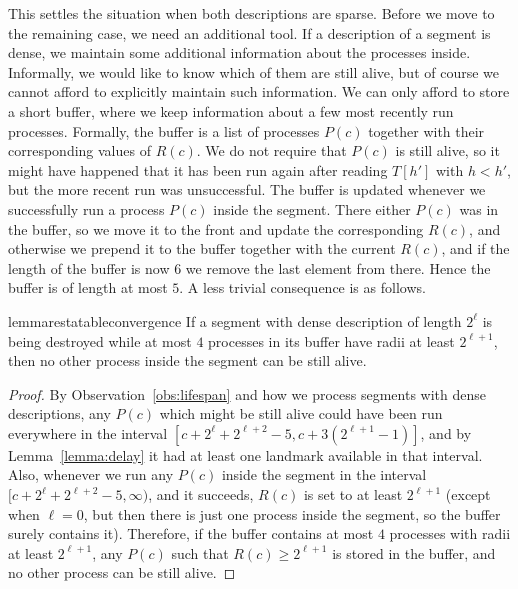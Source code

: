 \documentclass{article}[11pt,letter]
\newcommand{\head}{h}
\begin{document}
This settles the situation when both descriptions are sparse. Before we move to the remaining case, we need an additional tool. If a
description of a segment is dense, we maintain some additional information about the processes inside. Informally, we would like to know which
of them are still alive, but of course we cannot afford to explicitly maintain such information. We can only afford to store a short buffer, 
where we keep information about a few most recently run processes. Formally, the buffer is a list of processes $P(c)$ together with their
corresponding values of $R(c)$. We do not require that $P(c)$ is still alive, so it might have happened that it has been run again after reading $T[\head']$
with $h<h'$, but the more recent run was unsuccessful. The buffer is updated whenever we successfully run a process $P(c)$ inside the segment.
There either $P(c)$ was in the buffer, so we move it to the front and update the corresponding $R(c)$, and otherwise
we prepend it to the buffer together with the current $R(c)$, and if the length of the buffer is now $6$ we remove the last element from there.
 Hence the buffer is of length at most $5$. A less trivial consequence is as follows.

\begin{restatable}{lemma}{restatableconvergence}
\label{lemma:convergence}
If a segment with dense description of length $2^{\ell}$ is being destroyed while at most $4$ processes in its buffer have radii at least $2^{\ell+1}$, 
then no other process inside the segment can be still alive.
\end{restatable}

\begin{proof}
By Observation~\ref{obs:lifespan} and how we process segments with dense descriptions, any $P(c)$ which might be still alive could have been run everywhere
in the interval $[c+2^{\ell}+2^{\ell+2}-5,c+3(2^{\ell+1}-1)]$, and by Lemma~\ref{lemma:delay} it had at least one
landmark available in that interval. Also, whenever we run any $P(c)$ inside the segment in the interval $[c+2^{\ell}+2^{\ell+2}-5,\infty)$, and 
it succeeds, $R(c)$ is set to at least $2^{\ell+1}$ (except when $\ell=0$, but then there is just one process inside the segment, so the buffer
surely contains it). Therefore, if the buffer contains at most $4$ processes with radii at least $2^{\ell+1}$, any $P(c)$ such that $R(c)\geq 2^{\ell+1}$
is stored in the buffer, and no other process can be still alive.
\end{proof}
\end{document}
